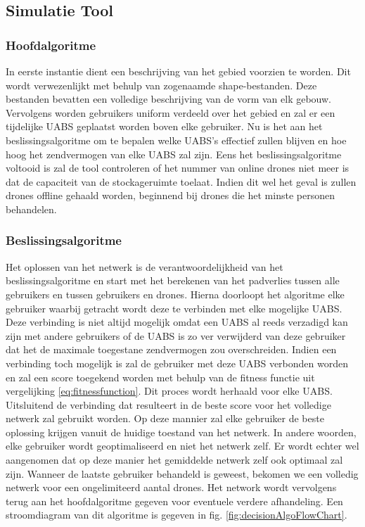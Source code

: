 \documentclass[twocolumn]{phdsymp_dutch}
\begin{document}
\subsection{Simulatie Tool}

\subsubsection{Hoofdalgoritme}
In eerste instantie dient een beschrijving van het gebied voorzien te worden. Dit wordt verwezenlijkt met behulp van 
zogenaamde shape-bestanden. Deze bestanden bevatten een volledige beschrijving van de vorm van elk gebouw. Vervolgens 
worden gebruikers uniform verdeeld over het gebied en zal er een tijdelijke \gls{UABS} geplaatst worden boven elke gebruiker.
Nu is het aan het beslissingsalgoritme om te bepalen welke \gls{UABS}'s effectief zullen blijven en hoe hoog het zendvermogen van elke \gls{UABS}
zal zijn. Eens het beslissingsalgoritme voltooid is zal de tool controleren of het nummer van online drones niet meer is dat 
de capaciteit van de stockageruimte toelaat. Indien dit wel het geval is zullen drones offline gehaald worden, beginnend bij 
drones die het minste personen behandelen.

\subsubsection{Beslissingsalgoritme}

Het oplossen van het netwerk is de verantwoordelijkheid van het beslissingsalgoritme en start met het berekenen van het padverlies tussen 
alle gebruikers en tussen gebruikers en drones. Hierna doorloopt het algoritme elke gebruiker waarbij getracht wordt deze te verbinden 
met elke mogelijke \gls{UABS}. Deze verbinding is niet altijd mogelijk omdat een \gls{UABS} al reeds verzadigd kan zijn met andere gebruikers of 
de \gls{UABS} is zo ver verwijderd van deze gebruiker dat het de maximale toegestane zendvermogen zou overschreiden.
Indien een verbinding toch mogelijk is zal de gebruiker met deze \gls{UABS} verbonden worden en zal een score toegekend worden met behulp van 
de fitness functie uit vergelijking \ref{eq:fitnessfunction}. 
Dit proces wordt herhaald voor elke \gls{UABS}. Uitsluitend de verbinding dat resulteert in de beste score voor het volledige netwerk 
zal gebruikt worden. 
Op deze mannier zal elke gebruiker de beste oplossing krijgen vanuit de huidige toestand van het netwerk.
In andere woorden, elke gebruiker wordt geoptimaliseerd en niet het netwerk zelf. Er wordt echter wel aangenomen dat 
op deze manier het gemiddelde netwerk zelf ook optimaal zal zijn.
Wanneer de laatste gebruiker behandeld is geweest, bekomen we een volledig netwerk voor een ongelimiteerd aantal drones.
Het network wordt vervolgens terug aan het hoofdalgoritme gegeven voor eventuele verdere afhandeling.
Een stroomdiagram van dit algoritme is gegeven in fig. \ref{fig:decisionAlgoFlowChart}.
\end{document}

